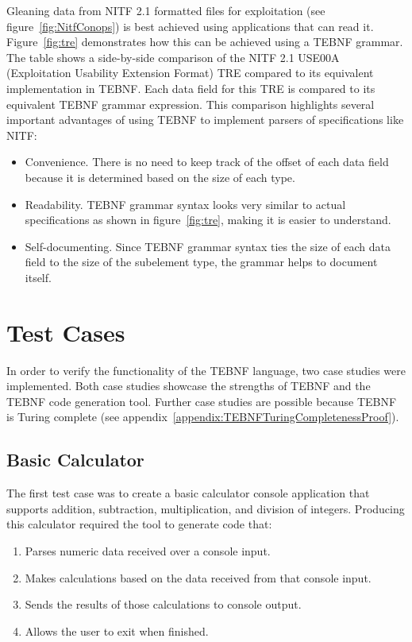 \indent
Gleaning data from NITF 2.1 formatted files for exploitation (see figure~\ref{fig:NitfConops}) is best achieved using applications that can read it.  Figure~\ref{fig:tre} demonstrates how this can be achieved using a TEBNF grammar.  The table shows a side-by-side comparison of the NITF 2.1 USE00A (Exploitation Usability Extension Format) TRE \cite{use001_01} compared to its equivalent implementation in TEBNF.  Each data field for this TRE is compared to its equivalent TEBNF grammar expression.  This comparison highlights several important advantages of using TEBNF to implement parsers of specifications like NITF:
\begin{itemize}
  \item Convenience.  There is no need to keep track of the offset of each data field because it is determined based on the size of each type.
  \item Readability.  TEBNF grammar syntax looks very similar to actual specifications as shown in figure~\ref{fig:tre}, making it is easier to understand.
  \item Self-documenting.  Since TEBNF grammar syntax ties the size of each data field to the size of the subelement type, the grammar helps to document itself. 
\end{itemize}

\section{Test Cases}
In order to verify the functionality of the TEBNF language, two case studies were implemented.  Both case studies showcase the strengths of TEBNF and the TEBNF code generation tool.  Further case studies are possible because TEBNF is Turing complete (see appendix~\ref{appendix:TEBNFTuringCompletenessProof}).

\subsection{Basic Calculator}
The first test case was to create a basic calculator console application that supports addition, subtraction, multiplication, and division of integers.  Producing this calculator required the tool to generate code that:
\begin{enumerate}
  \item Parses numeric data received over a console input.
  \item Makes calculations based on the data received from that console input.
  \item Sends the results of those calculations to console output.
  \item Allows the user to exit when finished.
\end{enumerate}

